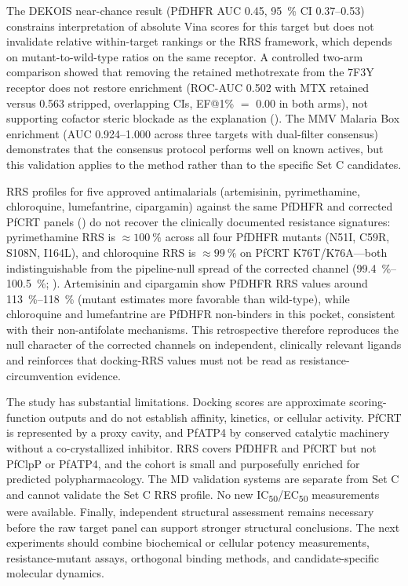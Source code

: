 \documentclass[journal=jcisd8,manuscript=article]{achemso}
\begin{document}
The DEKOIS near-chance result (PfDHFR AUC \num{0.45}, \qty{95}{\percent} CI \numrange{0.37}{0.53}) constrains interpretation of absolute Vina scores for this target but does not invalidate relative within-target rankings or the RRS framework, which depends on mutant-to-wild-type ratios on the same receptor. A controlled two-arm comparison showed that removing the retained methotrexate from the 7F3Y receptor does not restore enrichment (ROC-AUC \num{0.502} with MTX retained versus \num{0.563} stripped, overlapping CIs, EF@1\% $=$ \num{0.00} in both arms), not supporting cofactor steric blockade as the explanation (). The MMV Malaria Box enrichment (AUC \numrange{0.924}{1.000} across three targets with dual-filter consensus) demonstrates that the consensus protocol performs well on known actives, but this validation applies to the method rather than to the specific Set C candidates.

RRS profiles for five approved antimalarials (artemisinin, pyrimethamine, chloroquine, lumefantrine, cipargamin) against the same PfDHFR and corrected PfCRT panels () do not recover the clinically documented resistance signatures: pyrimethamine RRS is $\approx\qty{100}{\percent}$ across all four PfDHFR mutants (N51I, C59R, S108N, I164L), and chloroquine RRS is $\approx\qty{99}{\percent}$ on PfCRT K76T/K76A---both indistinguishable from the pipeline-null spread of the corrected channel (\qtyrange{99.4}{100.5}{\percent}; ). Artemisinin and cipargamin show PfDHFR RRS values around \qtyrange{113}{118}{\percent} (mutant estimates more favorable than wild-type), while chloroquine and lumefantrine are PfDHFR non-binders in this pocket, consistent with their non-antifolate mechanisms. This retrospective therefore reproduces the null character of the corrected channels on independent, clinically relevant ligands and reinforces that docking-RRS values must not be read as resistance-circumvention evidence.

The study has substantial limitations. Docking scores are approximate scoring-function outputs and do not establish affinity, kinetics, or cellular activity. PfCRT is represented by a proxy cavity, and PfATP4 by conserved catalytic machinery without a co-crystallized inhibitor. RRS covers PfDHFR and PfCRT but not PfClpP or PfATP4, and the cohort is small and purposefully enriched for predicted polypharmacology. The MD validation systems are separate from Set C and cannot validate the Set C RRS profile. No new IC\textsubscript{50}/EC\textsubscript{50} measurements were available. Finally, independent structural assessment remains necessary before the raw target panel can support stronger structural conclusions. The next experiments should combine biochemical or cellular potency measurements, resistance-mutant assays, orthogonal binding methods, and candidate-specific molecular dynamics.
\end{document}
